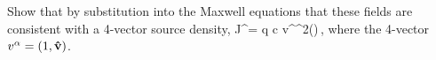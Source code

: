 \newcommand{\Ja}{J^\alp}
\newcommand{\Jb}{J^\bet}
\newcommand{\dela}{\partial_\alp}
\newcommand{\valp}{v^\alp}
\newcommand{\delrp}{\del^2(\vrperp)}

\begin{problem}
	Show that by substitution into the Maxwell equations that these fields are consistent with a 4-vector source density,
	\beq
		\Ja = q c \valp \delrp \,\delctz,
	\eeq
	where the 4-vector $\valp = (1, \vh)$.
\end{problem}

\newcommand{\cV}{\mathcal{V}}
\newcommand{\dcV}{\partial \cV}
\newcommand{\dS}{\partial S}
\newcommand{\nh}{\vb{\hat{n}}}
\newcommand{\vro}{\vr_0}
\newcommand{\grperp}{\grad_{\!\perp}}

\newcommand{\Jo}{J^0}
\newcommand{\vJ}{\vb{J}}
\newcommand{\vaa}{\vb{a}}
\newcommand{\rperpx}{{\rperp}_x}
\newcommand{\rperpy}{{\rperp}_y}

